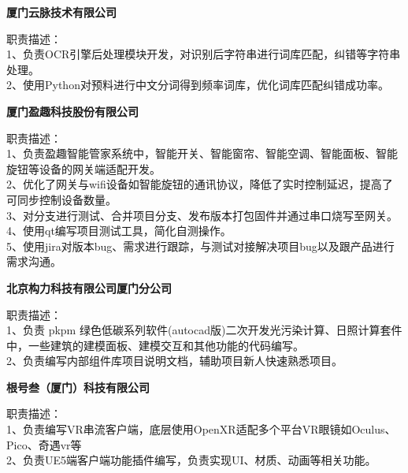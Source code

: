 \documentclass{resume} %
\begin{document}
\begin{rSection}{}

\textbf{厦门云脉技术有限公司}\qquad\qquad{}\qquad\qquad{}
\item	职责描述：\\ 
1、负责OCR引擎后处理模块开发，对识别后字符串进行词库匹配，纠错等字符串处理。\\
2、使用Python对预料进行中文分词得到频率词库，优化词库匹配纠错成功率。


\textbf{厦门盈趣科技股份有限公司}\qquad\qquad{}\qquad\qquad{}
\item	职责描述：\\
1、负责盈趣智能管家系统中，智能开关、智能窗帘、智能空调、智能面板、智能旋钮等设备的网关端适配开发。\\
2、优化了网关与wifi设备如智能旋钮的通讯协议，降低了实时控制延迟，提高了可同步控制设备数量。\\
3、对分支进行测试、合并项目分支、发布版本打包固件并通过串口烧写至网关。\\
4、使用qt编写项目测试工具，简化自测操作。\\
5、使用jira对版本bug、需求进行跟踪，与测试对接解决项目bug以及跟产品进行需求沟通。

\textbf{北京构力科技有限公司厦门分公司}\qquad\qquad{}\qquad\qquad{}
\item	职责描述：\\
1、负责 pkpm 绿色低碳系列软件(autocad版)二次开发光污染计算、日照计算套件中，一些建筑的建模面板、建模交互和其他功能的代码编写。\\
2、负责编写内部组件库项目说明文档，辅助项目新人快速熟悉项目。

\textbf{根号叁（厦门）科技有限公司}\qquad\qquad{}\qquad\qquad{}
\item	职责描述：\\1、负责编写VR串流客户端，底层使用OpenXR适配多个平台VR眼镜如Oculus、Pico、奇遇vr等\\
2、负责UE5端客户端功能插件编写，负责实现UI、材质、动画等相关功能。

\end{rSection}

\end{document}
